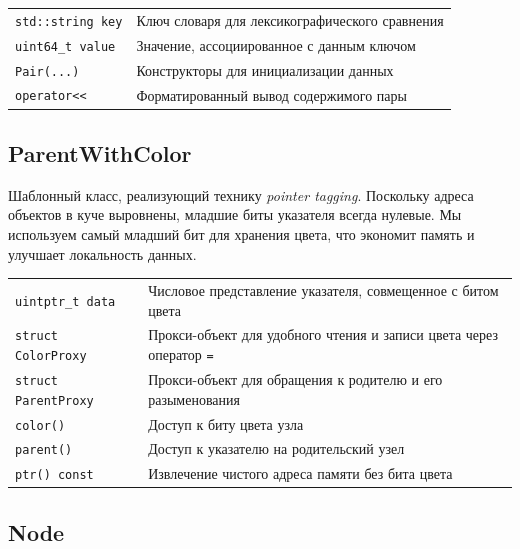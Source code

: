 \begin{table}[!ht]
\centering
\begin{tabular}{|p{7.5cm}|p{7.5cm}|}
\hline
\rowcolor{lightgray}
\multicolumn{2}{|c|}{Pair} \\
\hline
\texttt{std::string key} & Ключ словаря для лексикографического сравнения \\
\hline
\texttt{uint64\_t value} & Значение, ассоциированное с данным ключом \\
\hline
\texttt{Pair(...)} & Конструкторы для инициализации данных \\
\hline
\texttt{operator<<} & Форматированный вывод содержимого пары \\
\hline
\end{tabular}
\end{table}

\subsection{ParentWithColor}

Шаблонный класс, реализующий технику \textit{pointer tagging}. Поскольку адреса объектов в куче выровнены, младшие биты указателя всегда нулевые. Мы используем самый младший бит для хранения цвета, что экономит память и улучшает локальность данных.

\begin{table}[!ht]
\centering
\begin{tabular}{|p{7.5cm}|p{7.5cm}|}
\hline
\rowcolor{lightgray}
\multicolumn{2}{|c|}{ParentWithColor<T>} \\
\hline
\texttt{uintptr\_t data} & Числовое представление указателя, совмещенное с битом цвета \\
\hline
\texttt{struct ColorProxy} & Прокси-объект для удобного чтения и записи цвета через оператор \texttt{=} \\
\hline
\texttt{struct ParentProxy} & Прокси-объект для обращения к родителю и его разыменования \\
\hline
\texttt{color()} & Доступ к биту цвета узла \\
\hline
\texttt{parent()} & Доступ к указателю на родительский узел \\
\hline
\texttt{ptr() const} & Извлечение чистого адреса памяти без бита цвета \\
\hline
\end{tabular}
\end{table}

\subsection{Node}

